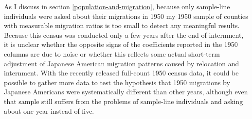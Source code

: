 \documentclass[12pt]{article}
\begin{document}
As I discuss in section \ref{population-and-migration}, 
because only sample-line individuals were asked about their migrations in 1950
my 1950 sample of counties with measurable migration ratios is too small 
to detect any meaningful results.
Because this census was conducted only a few years after the end of internment,
it is unclear whether the opposite signs of the coefficients reported in the 1950 columns 
are due to noise or whether this reflects some actual short-term adjustment of 
Japanese American migration patterns caused by relocation and internment.
With the recently released full-count 1950 census data, it could be possible to gather more data to test the hypothesis that 1950 migrations by Japanese Americans were systematically different than other years,
although even that sample still suffers from the problems of sample-line individuals and asking about one year instead of five.



\end{document}
